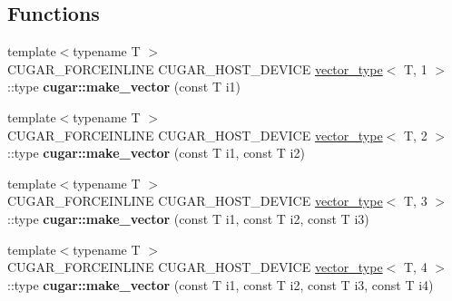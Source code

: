 \subsection*{Functions}
\begin{DoxyCompactItemize}
\item 
\mbox{\label{group___vector_types_module_ga5ecc9f1d769ffb8d22aa22b4aadaea71}} 
{\footnotesize template$<$typename T $>$ }\\C\+U\+G\+A\+R\+\_\+\+F\+O\+R\+C\+E\+I\+N\+L\+I\+NE C\+U\+G\+A\+R\+\_\+\+H\+O\+S\+T\+\_\+\+D\+E\+V\+I\+CE \hyperlink{structcugar_1_1vector__type}{vector\+\_\+type}$<$ T, 1 $>$\+::type {\bfseries cugar\+::make\+\_\+vector} (const T i1)
\item 
\mbox{\label{group___vector_types_module_ga4c8a36e1145b6a0db328d335bef15598}} 
{\footnotesize template$<$typename T $>$ }\\C\+U\+G\+A\+R\+\_\+\+F\+O\+R\+C\+E\+I\+N\+L\+I\+NE C\+U\+G\+A\+R\+\_\+\+H\+O\+S\+T\+\_\+\+D\+E\+V\+I\+CE \hyperlink{structcugar_1_1vector__type}{vector\+\_\+type}$<$ T, 2 $>$\+::type {\bfseries cugar\+::make\+\_\+vector} (const T i1, const T i2)
\item 
\mbox{\label{group___vector_types_module_gacbbe2a15e18af1890cd4bb223d4edee6}} 
{\footnotesize template$<$typename T $>$ }\\C\+U\+G\+A\+R\+\_\+\+F\+O\+R\+C\+E\+I\+N\+L\+I\+NE C\+U\+G\+A\+R\+\_\+\+H\+O\+S\+T\+\_\+\+D\+E\+V\+I\+CE \hyperlink{structcugar_1_1vector__type}{vector\+\_\+type}$<$ T, 3 $>$\+::type {\bfseries cugar\+::make\+\_\+vector} (const T i1, const T i2, const T i3)
\item 
\mbox{\label{group___vector_types_module_ga116723ebc5ad7764bdb8bdddfd2f1748}} 
{\footnotesize template$<$typename T $>$ }\\C\+U\+G\+A\+R\+\_\+\+F\+O\+R\+C\+E\+I\+N\+L\+I\+NE C\+U\+G\+A\+R\+\_\+\+H\+O\+S\+T\+\_\+\+D\+E\+V\+I\+CE \hyperlink{structcugar_1_1vector__type}{vector\+\_\+type}$<$ T, 4 $>$\+::type {\bfseries cugar\+::make\+\_\+vector} (const T i1, const T i2, const T i3, const T i4)
\end{DoxyCompactItemize}
